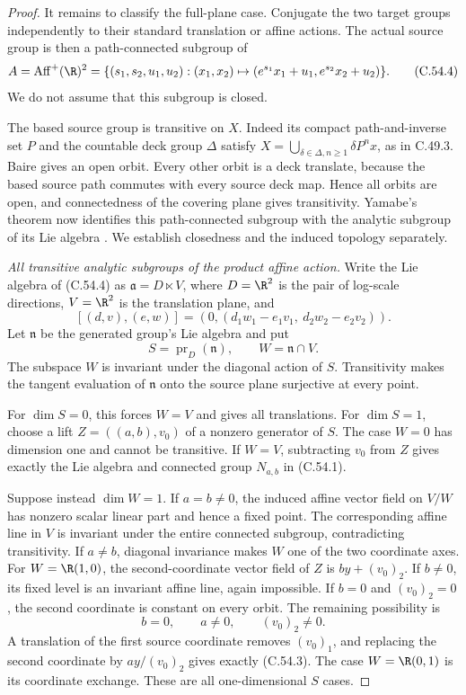 \begin{proof}
It remains to classify the full-plane case.
Conjugate the two target groups independently
to their standard translation or affine
actions. The actual source group is then a
path-connected subgroup of
\[
 A=\operatorname{Aff}^+(\R)^2
   =\{(s_1,s_2,u_1,u_2):
        (x_1,x_2)\mapsto
             (e^{s_1}x_1+u_1,e^{s_2}x_2+u_2)\}.
                                                               \tag{C.54.4}
\]
We do not assume that this subgroup is closed.

The based source group is transitive on $X$.
Indeed its compact path-and-inverse set $P$
and the countable deck group $\Delta$ satisfy
$X=\bigcup_{\delta\in\Delta,n\geq1}\delta P^n x$,
as in C.49.3. Baire gives an open orbit.
Every other orbit is a deck translate,
because the based source path commutes with
every source deck map. Hence all orbits are
open, and connectedness of the covering plane
gives transitivity. Yamabe's theorem now
identifies this path-connected subgroup with
the analytic subgroup of its Lie algebra
\cite[pp.~13--14]{C_Yamabe1950}. We establish
closedness and the induced topology separately.

\emph{All transitive analytic subgroups of the product affine action.}
Write the Lie algebra of (C.54.4) as
$\mathfrak a=D\ltimes V$, where $D=\R^2$ is
the pair of log-scale directions, $V=\R^2$
is the translation plane, and
\[
 [(d,v),(e,w)]
       =(0,(d_1w_1-e_1v_1,\ d_2w_2-e_2v_2)).
                                                               \tag{C.54.5}
\]
Let $\mathfrak n$ be the generated group's
Lie algebra and put
\[
 S=\operatorname{pr}_D(\mathfrak n),\qquad
 W=\mathfrak n\cap V.
                                                               \tag{C.54.6}
\]
The subspace $W$ is invariant under the
diagonal action of $S$.
Transitivity makes the tangent evaluation
of $\mathfrak n$ onto the source plane
surjective at every point.

For $\dim S=0$, this forces $W=V$ and gives
all translations.
For $\dim S=1$, choose a lift
$Z=((a,b),v_0)$ of a nonzero generator of $S$.
The case $W=0$ has dimension one and cannot
be transitive. If $W=V$, subtracting $v_0$
from $Z$ gives exactly the Lie algebra and
connected group $N_{a,b}$ in (C.54.1).

Suppose instead $\dim W=1$. If $a=b\ne0$,
the induced affine vector field on $V/W$
has nonzero scalar linear part and hence
a fixed point. The corresponding affine
line in $V$ is invariant under the entire
connected subgroup, contradicting
transitivity.
If $a\ne b$, diagonal invariance makes $W$
one of the two coordinate axes.
For $W=\R(1,0)$, the second-coordinate
vector field of $Z$ is $by+(v_0)_2$.
If $b\ne0$, its fixed level is an invariant
affine line, again impossible.
If $b=0$ and $(v_0)_2=0$, the second
coordinate is constant on every orbit.
The remaining possibility is
\[
                  b=0,\qquad a\ne0,\qquad (v_0)_2\ne0.
                                                               \tag{C.54.7}
\]
A translation of the first source coordinate
removes $(v_0)_1$, and replacing the second
coordinate by $ay/(v_0)_2$ gives exactly
(C.54.3). The case $W=\R(0,1)$ is its
coordinate exchange. These are all
one-dimensional $S$ cases.


\end{proof}
